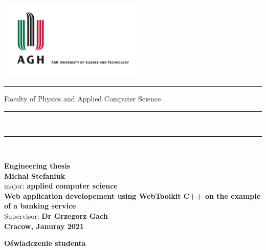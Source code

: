 \documentclass[a4paper,12pt]{book}
\begin{document}
\thispagestyle{empty}
\includegraphics[height=37.5mm]{agh_nzw_a_en_1w_wbr_pms}\\
\rule{30mm}{0pt}{
{\large \textsf{Faculty of Physics and Applied Computer Science}}\\
\rule{\textwidth}{3pt}\\
\rule[2ex]
{\textwidth}{1pt}\\
\vspace{7ex}
\begin{center}
{\LARGE \bf \textsf{Engineering thesis}}\\
\vspace{13ex}
{\bf \Large \textsf{Michal Stefaniuk}}\\
\vspace{3ex}
{\small \sf major: {\bf \textsf{applied computer science}}}\\
\vspace{1.5ex}
\vspace{10ex}
{\bf \huge \textsf{Web application developement using WebToolkit
C++ on the example of a banking service}}\\
\vspace{14ex}
{\Large \sf Supervisor: {\bf \textsf{Dr Grzegorz Gach}}}\\
\vspace{22ex}
{\large \bf \textsf{Cracow, Januray 2021}}
\end{center}

\newpage

\begin{center}
	{\bf\large\textsf{Oświadczenie studenta}}\\
\end{center}

}
\end{document}
